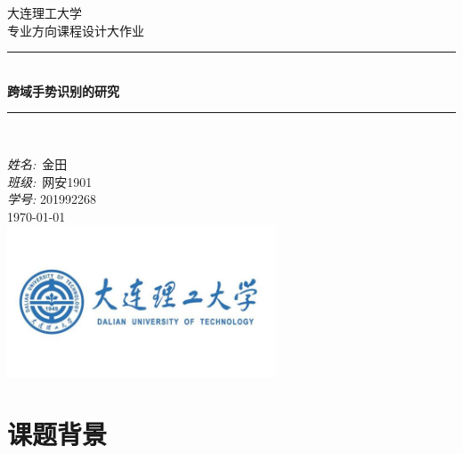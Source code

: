 \documentclass[a4paper]{article}
\begin{document}
\begin{titlepage}

\newcommand{\HRule}{\rule{\linewidth}{0.5mm}} 							%
\center 
 
\textsc{\LARGE 大连理工大学}\\[1cm]

\textsc{\Large 专业方向课程设计大作业}\\[0.2cm]

\HRule \\[0.8cm]
{ \huge \bfseries 跨域手势识别的研究}\\[0.7cm]								
\HRule \\[2cm]

\large

\emph{姓名:}\ 金\quad \quad 田  \\
\emph{班级:}\ 网安1901\\
\emph{学号:} 201992268\\[1.5cm]													%
{\large \today}\\[5cm]

\includegraphics[width=0.6\textwidth]{images/dlut.png}\\[1cm] 	%
\vfill 
\end{titlepage}


\setmainfont{Times New Roman}

\tableofcontents

\clearpage

\section{课题背景}
\end{document}
